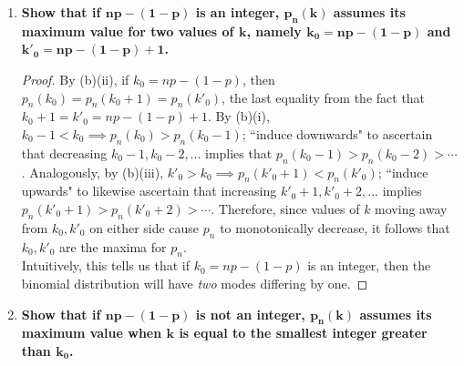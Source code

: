 \documentclass[10pt, oneside]{article}
\begin{document}
\begin{enumerate}[label=4.\arabic*]
\begin{enumerate}
\begin{enumerate}
		\begin{proof}
		Equivalently, we demonstrate that $p_n (k+1) / p_n (k) < 1$. Suppose $k > np - (1 - p)$. Then $n - k < n - np + (1-p) = (1 - p)(n + 1)$ and $k + 1 > np - (1 - p) + 1 = p(n+1)$. Then $\frac{n-k}{k+1} < \frac{(1-p)(n+1)}{p(n+1)} = \frac{1-p}{p}$, implying $p_n (k+1) / p_n (k) = \frac{n-k}{k+1} \frac{p}{1-p} < \frac{1-p}{p} \frac{p}{1-p} = 1$.
		\end{proof}
		\end{enumerate}
		
	\item  \begin{tcolorbox}[
	  colback=Cerulean!5!white,
	  colframe=Cerulean!75!black]
	\textbf{Show that if $\bm{np - (1 - p)}$ is an integer, $\bm{p_n (k)}$ assumes its maximum value for two values of $\bm{k}$, namely $\bm{k_0 = np - (1 - p)}$ and $\bm{k'_0 = np - (1 - p) + 1}$.}
	\end{tcolorbox}
	
	\begin{proof}
	By (b)(ii), if $k_0 = np - (1-p)$, then $p_n (k_0) = p_n (k_0 + 1) = p_n (k'_0)$, the last equality from the fact that $k_0 + 1 = k'_0 = np - (1-p) + 1$. By (b)(i), $k_0 - 1 < k_0 \implies p_n(k_0) > p_n(k_0 - 1)$; ``induce downwards" to ascertain that decreasing $k_0 - 1, k_0 - 2,...$ implies that $p_n (k_0 - 1) > p_n (k_0 - 2) > \cdots$. Analogously, by (b)(iii), $k'_0 > k_0 \implies p_n(k'_0 + 1) < p_n(k'_0)$; ``induce upwards" to likewise ascertain that increasing $k'_0 + 1, k'_0 + 2, ...$ implies $p_n (k'_0 + 1) > p_n(k'_0 + 2) > \cdots$. Therefore, since values of $k$ moving away from $k_0, k'_0$ on either side cause $p_n$ to monotonically decrease, it follows that $k_0, k'_0$ are the maxima for $p_n$. \\
	
	Intuitively, this tells us that if $k_0 = np - (1-p)$ is an integer, then the binomial distribution will have \textit{two} modes differing by one.
	\end{proof}
	
	\item  \begin{tcolorbox}[
	  colback=Cerulean!5!white,
	  colframe=Cerulean!75!black]
	\textbf{Show that if $\bm{np - (1 - p)}$ is not an integer, $\bm{p_n (k)}$ assumes its maximum value when $\bm{k}$ is equal to the smallest integer greater than $\bm{k_0}$.}
	\end{tcolorbox}
	

\end{enumerate}
\end{enumerate}
\end{document}

